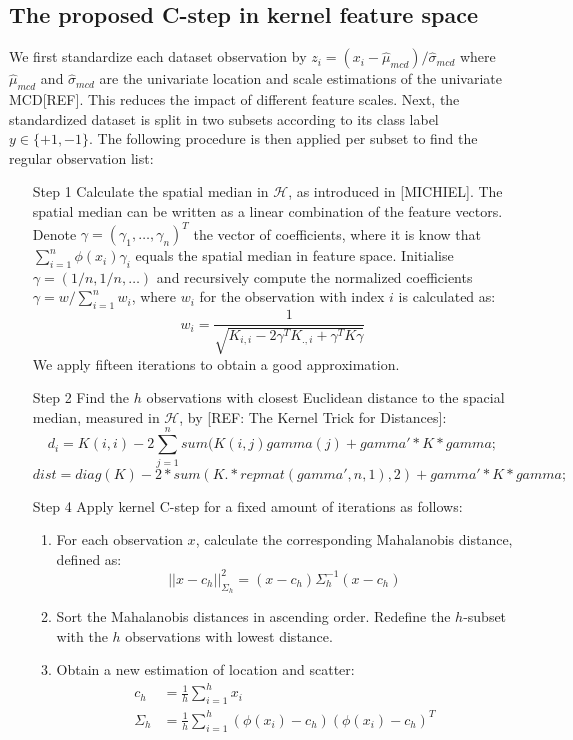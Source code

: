 \documentclass[preprint,12pt]{elsarticle}
\begin{document}
\subsection{The proposed C-step in kernel feature space}

We first standardize each dataset observation by $z_i = (x_i - \hat{\mu}_{mcd}) / \hat{\sigma}_{mcd}$ where $\hat{\mu}_{mcd}$ and $\hat{\sigma}_{mcd}$ are the univariate location and scale estimations of the univariate MCD[REF]. This reduces the impact of different feature scales. Next, the standardized dataset is split in two subsets according to its class label $y \in \{+1, -1\}$. The following procedure is then applied per subset to find the regular observation list:

\begin{itemize}
	\item [Step 1] Calculate the spatial median in $\mathcal{H}$, as introduced in [MICHIEL]. The spatial median can be written as a linear combination of the feature vectors. Denote $\gamma = (\gamma_1, \dots, \gamma_n)^T$ the vector of coefficients, where it is know that $\sum_{i=1}^{n} \phi(x_i) \gamma_i$ equals the spatial median in feature space. Initialise $\gamma = (1/n, 1/n, \dots)$ and recursively compute the normalized coefficients $\gamma = w / \sum_{i=1}^{n}w_i$, where $w_i$ for the observation with index $i$ is calculated as:
	\begin{equation}
		w_i = \frac{1}{\sqrt{ K_{i,i} - 2 \gamma^T K_{., i} + \gamma^T K \gamma}}
	\end{equation}
	We apply fifteen iterations to obtain a good approximation.	
	\item [Step 2] Find the $h$ observations with closest Euclidean distance to the spacial median, measured in $\mathcal{H}$, by [REF: The Kernel Trick for Distances]:	
	\begin{equation}
		d_i = K(i,i) - 2\sum_{j=1}^{n}sum(K(i, j) gamma(j) + gamma'*K*gamma;
	\end{equation} 
	\begin{equation}
		dist = diag(K) - 2*sum(K.*repmat(gamma',n,1),2) + gamma'*K*gamma;
	\end{equation} 
	\item [Step 4] Apply kernel C-step for a fixed amount of iterations as follows:
	\begin{enumerate}	
		\item For each observation $x$, calculate the corresponding Mahalanobis distance, defined as:
		\begin{equation}
		||x - c_h||^2_{\Sigma_h} = (x - c_h) \Sigma^{-1}_h (x - c_h)
		\end{equation}	
		\item Sort the Mahalanobis distances in ascending order. Redefine the $h$-subset with the $h$ observations with lowest distance. 
		\item Obtain a new estimation of location and scatter:
		\begin{align}
		c_h &= \frac{1}{h} \sum_{i=1}^{h}x_i \\
		\Sigma_h &= \frac{1}{h} \sum_{i=1}^{h} (\phi(x_i) - c_h) (\phi(x_i) - c_h)^T 
		\end{align}
		

\end{enumerate}
\end{itemize}
\end{document}
